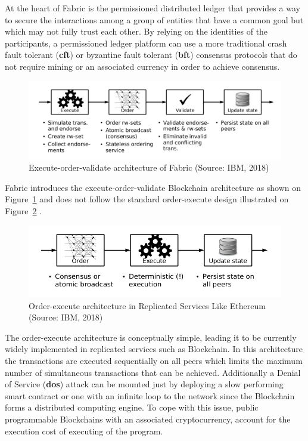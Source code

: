 At the heart of Fabric is the permissioned distributed ledger that provides a
way to secure the interactions among a group of entities that have a common
goal but which may not fully trust each other. By relying on the identities of
the participants, a permissioned ledger platform can use a more traditional
crash fault tolerant (\textbf{cft}) or byzantine fault tolerant (\textbf{bft})
consensus protocols that do not require mining or an associated currency in
order to achieve consensus.

\begin{figure}[h]
  \centering
  \includegraphics[width=1\linewidth]{imgs/executeOrderValidate.png}
  \caption{\label{fig:executeorder} Execute-order-validate architecture of
  Fabric (Source: IBM, 2018)}
\end{figure}

Fabric introduces the execute-order-validate Blockchain architecture as shown
on Figure~\ref{fig:executeorder} and does not follow the standard order-execute
design illustrated on Figure~\ref{fig:orderexecute} \cite{Androulaki2018}. 

\begin{figure}[h]
  \centering
  \includegraphics[width=0.8\linewidth]{imgs/orderExecuteArchitecture.png}
  \caption{\label{fig:orderexecute} Order-execute architecture in Replicated
  Services Like Ethereum (Source: IBM, 2018)}
\end{figure}

The order-execute architecture is conceptually simple, leading it to be
currently widely implemented in replicated services such as Blockchain. In this
architecture the transactions are executed sequentially on all peers which
limits the maximum number of simultaneous transactions that can be achieved.
Additionally a Denial of Service (\textbf{dos}) attack can be mounted just by
deploying a slow performing smart contract or one with an infinite loop to the
network since the Blockchain forms a distributed computing engine.  To cope
with this issue, public programmable Blockchains with an associated
cryptocurrency, account for the execution cost of executing of the program.

